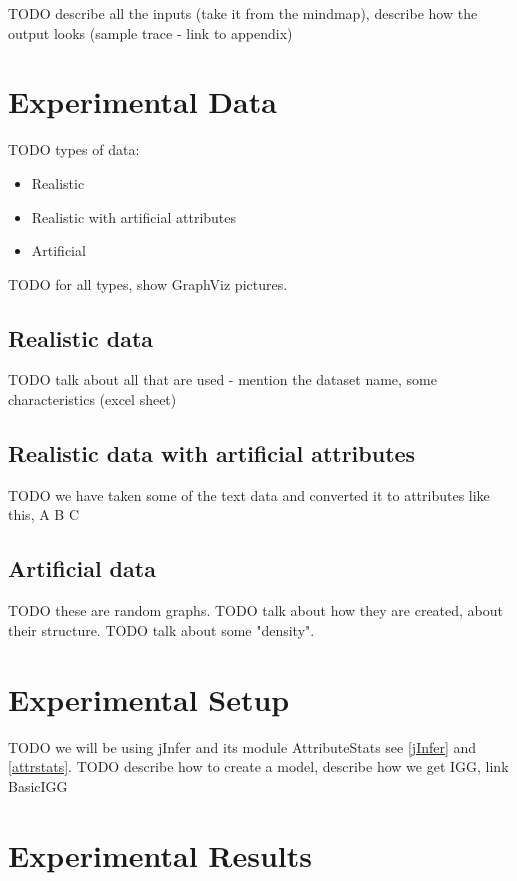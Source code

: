 \documentclass[a4paper,12pt,oneside]{report}
\begin{document}
TODO describe all the inputs (take it from the mindmap), describe how the output looks (sample trace - link to appendix)

\section{Experimental Data}

TODO types of data:
\begin{itemize}
	\item Realistic 
	\item Realistic with artificial attributes
	\item Artificial
\end{itemize}

TODO for all types, show GraphViz pictures.

\subsection{Realistic data}

TODO talk about all that are used - mention the dataset name, some characteristics (excel sheet)

\subsection{Realistic data with artificial attributes}

TODO we have taken some of the text data and converted it to attributes like this, A B C

\subsection{Artificial data}

TODO these are random graphs.
TODO talk about how they are created, about their structure.
TODO talk about some "density".

\section{Experimental Setup}

TODO we will be using jInfer and its module AttributeStats see \ref{jInfer} and \ref{attrstats}.
TODO describe how to create a model, describe how we get IGG, link BasicIGG

\section{Experimental Results}
\end{document}
